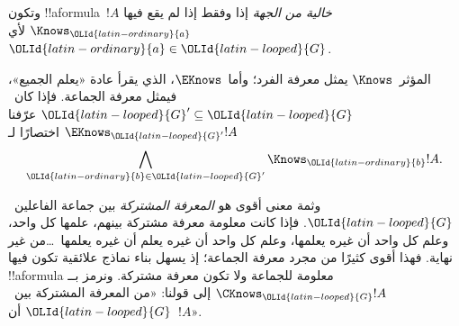 \documentclass[../../../include/open-logic-section]{subfiles}
\begin{document}
وتكون !!a{formula}~$!A$ \emph{خالية من الجهة} إذا وفقط إذا لم يقع فيها
$\Knows_\OLId{latin-ordinary}{a}$ لأي~$\OLId{latin-ordinary}{a} \in \OLId{latin-looped}{G}$.

\begin{defn}
  المؤثر~$\Knows$ يمثل معرفة الفرد؛ وأما~$\EKnows$، الذي يقرأ عادة
  «يعلم الجميع»، فيمثل معرفة الجماعة. فإذا كان~$\OLId{latin-looped}{G}' \subseteq \OLId{latin-looped}{G}$ عرّفنا
  $\EKnows_{\OLId{latin-looped}{G}'} !A$ اختصارًا لـ
  \[\bigwedge_{\OLId{latin-ordinary}{b} \in \OLId{latin-looped}{G}'} \Knows_\OLId{latin-ordinary}{b} !A.\]
\end{defn}

وثمة معنى أقوى هو \emph{المعرفة المشتركة} بين جماعة الفاعلين~$\OLId{latin-looped}{G}$. فإذا
كانت معلومة معرفة مشتركة بينهم، علمها كل واحد، وعلم كل واحد أن غيره
يعلمها، وعلم كل واحد أن غيره يعلم أن غيره يعلمها~\dots من غير نهاية.
فهذا أقوى كثيرًا من مجرد معرفة الجماعة؛ إذ يسهل بناء نماذج علائقية تكون
فيها !!a{formula} معلومة للجماعة ولا تكون معرفة مشتركة. ونرمز بــ
$\CKnows_\OLId{latin-looped}{G} !A$ إلى قولنا: «من المعرفة المشتركة بين~$\OLId{latin-looped}{G}$ أن~$!A$».
\end{document}
